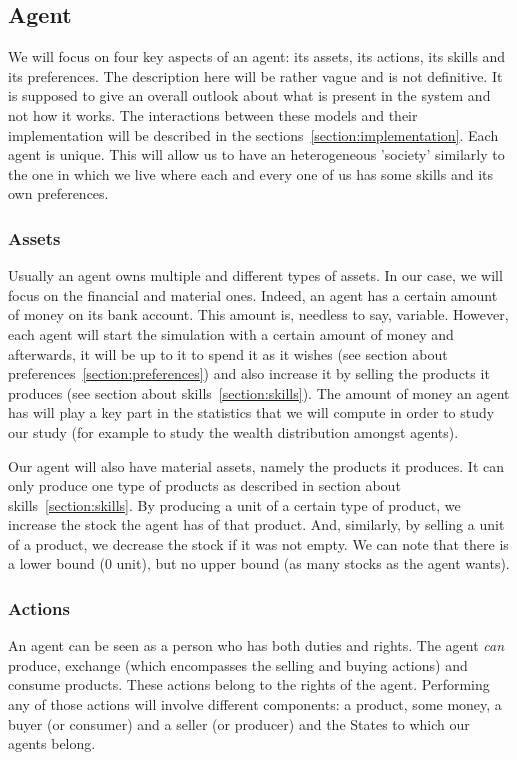 \documentclass[12pt]{article}
\begin{document}
\subsection{Agent}\label{section:agent}
We will focus on four key aspects of an agent: its assets, its actions, its skills and its preferences. The description here will be rather vague and is not definitive. It is supposed to give an overall outlook about what is present in the system and not how it works. The interactions between these models and their implementation will be described in the sections~\ref{section:implementation}. Each agent is unique. This will allow us to have an heterogeneous 'society' similarly to the one in which we live where each and every one of us has some skills and its own preferences.

\subsubsection{Assets}\label{section:assets}
Usually an agent owns multiple and different types of assets. In our case, we will focus on the financial and material ones. Indeed, an agent has a certain amount of money on its bank account. This amount is, needless to say, variable. 
However, each agent will start the simulation with a certain amount of money and afterwards, it will be up to it to spend it as it wishes (see section about preferences~\ref{section:preferences}) and also increase it by selling the products it produces (see section about skills~\ref{section:skills}). 
The amount of money an agent has will play a key part in the statistics that we will compute in order to study our study (for example to study the wealth distribution amongst agents). 

Our agent will also have material assets, namely the products it produces. It can only produce one type of products as described in section about skills~\ref{section:skills}. By producing a unit of a certain type of product, we increase the stock the agent has of that product. And, similarly, by selling a unit of a product, we decrease the stock if it was not empty. We can note that there is a lower bound (0 unit), but no upper bound (as many stocks as the agent wants).


\subsubsection{Actions}\label{section:actions}
An agent can be seen as a person who has both duties and rights. The agent \emph{can} produce, exchange (which encompasses the selling and buying actions) and consume products. These actions belong to the rights of the agent. Performing any of those actions will involve different components: a product, some money, a buyer (or consumer) and a seller (or producer) and the States to which our agents belong. 
\end{document}
